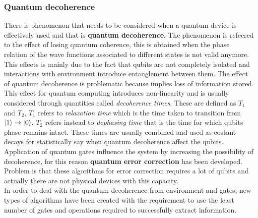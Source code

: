 \subsubsection{Quantum decoherence}
There is phenomenon that needs to be considered when a quantum device is effectively used and that is \textbf{quantum decoherence}. The phenomenon is refeered to the effect of losing quantum coherence, this is obtained when the phase relation of the wave functions associated to different states is not valid anymore. This effects is mainly due to the fact that qubits are not completely isolated and interactions with environment introduce entanglement between them. The effect of quantum decoherence is problematic because implies loss of information stored.\\
This effect for quantum computing introduces non-linearity and is usually considered through quantities called \textit{decoherence times}. These are defined as $T_1$ and $T_2$, $T_1$ refers to \textit{relaxation time} which is the time taken to transition from $\ket{1} \to \ket{0}$. $T_2$ refers instead to \textit{dephasing time} that is the time for which qubits phase remains intact. These times are usually combined and used as costant decays for statistically say when quantum decoherence affect the qubits. Application of quantum gates influence the system by increasing the possibility of decoherence, for this reason \textbf{quantum error correction} has been developed. Problem is that these algorithms for error correction requires a lot of qubits and actually there are not physical devices with this capacity.\\
In order to deal with the quantum decoherence from environment and gates, new types of algorithms have been created with the requirement to use the least number of gates and operations required to successfully extract information.
